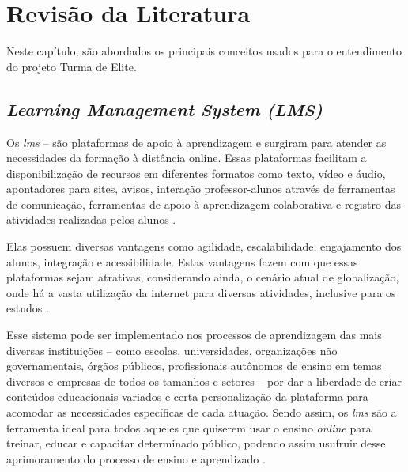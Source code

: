 \chapter{Revisão da Literatura}
Neste capítulo, são abordados os principais conceitos usados para o entendimento do projeto Turma de Elite.

\section{\textit{Learning Management System (LMS)}}
Os \textit{\ac{lms}} – são plataformas de apoio à aprendizagem e surgiram para atender as necessidades da formação à distância online. Essas plataformas facilitam a disponibilização de recursos em diferentes formatos como texto, vídeo e áudio, apontadores para sites, avisos, interação professor-alunos através de ferramentas de comunicação, ferramentas de apoio à aprendizagem colaborativa e registro das atividades realizadas pelos alunos \cite{rentabilizacao-ens-basico-e-secundario:2007}.

Elas possuem diversas vantagens como agilidade, escalabilidade, engajamento dos alunos, integração e acessibilidade. Estas vantagens fazem com que essas plataformas sejam atrativas, considerando ainda, o cenário atual de globalização, onde há a vasta utilização da internet para diversas atividades, inclusive para os estudos \cite{ludopro:2021}.

Esse sistema pode ser implementado nos processos de aprendizagem das mais diversas instituições – como escolas, universidades, organizações não governamentais, órgãos públicos, profissionais autônomos de ensino em temas diversos e empresas de todos os tamanhos e setores – por dar a liberdade de criar conteúdos educacionais variados e certa personalização da plataforma para acomodar as necessidades específicas de cada atuação. Sendo assim, os \textit{\ac{lms}} são a ferramenta ideal para todos aqueles que quiserem usar o ensino \textit{online} para treinar, educar e capacitar determinado público, podendo assim usufruir desse aprimoramento do processo de ensino e aprendizado \cite{ludopro:2021}.


